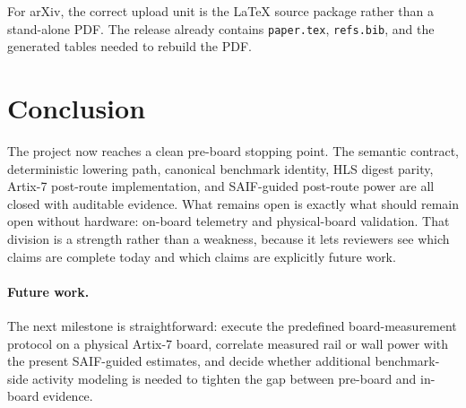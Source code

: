 \documentclass[11pt]{article}
\begin{document}
For arXiv, the correct upload unit is the LaTeX source package rather than a stand-alone PDF. The release already contains \texttt{paper.tex}, \texttt{refs.bib}, and the generated tables needed to rebuild the PDF.

\section{Conclusion}
The project now reaches a clean pre-board stopping point. The semantic contract, deterministic lowering path, canonical benchmark identity, HLS digest parity, Artix-7 post-route implementation, and SAIF-guided post-route power are all closed with auditable evidence. What remains open is exactly what should remain open without hardware: on-board telemetry and physical-board validation. That division is a strength rather than a weakness, because it lets reviewers see which claims are complete today and which claims are explicitly future work.

\paragraph{Future work.}
The next milestone is straightforward: execute the predefined board-measurement protocol on a physical Artix-7 board, correlate measured rail or wall power with the present SAIF-guided estimates, and decide whether additional benchmark-side activity modeling is needed to tighten the gap between pre-board and in-board evidence.
\end{document}
